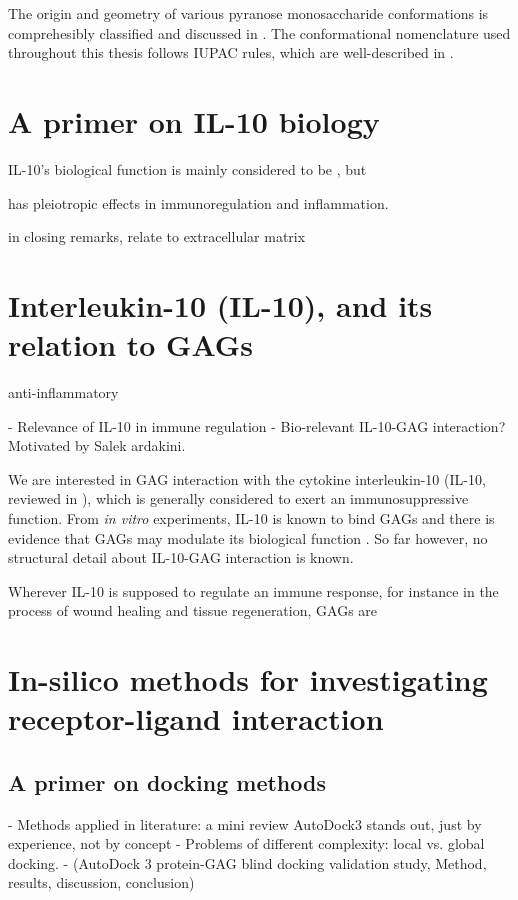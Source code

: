 The origin and geometry of various pyranose monosaccharide conformations is
comprehesibly classified and discussed in
\cite{classification_pyranose_conformers_1960}. The conformational nomenclature
used throughout this thesis follows IUPAC rules, which are well-described in
\cite{iupac_gag_conformations_1980}.


\section{A primer on IL-10 biology}

 IL-10's biological function is mainly considered to be
, but

 has pleiotropic effects in immunoregulation and
inflammation.


        in closing remarks, relate to extracellular matrix


\section{Interleukin-10 (IL-10), and its relation to GAGs}


 anti-inflammatory

- Relevance of IL-10 in immune regulation
- Bio-relevant IL-10-GAG interaction? Motivated by Salek ardakini.

We are interested in GAG interaction with the cytokine interleukin-10 (IL-10,
reviewed in \cite{moore_2001}), which is generally considered to exert an
immunosuppressive function. From \textit{in vitro} experiments, IL-10 is known
to bind GAGs and there is evidence that GAGs may modulate its biological
function \cite{salek_ardakani_2000}. So far however, no structural detail about
IL-10-GAG interaction is known.


Wherever IL-10 is supposed to
regulate an immune response, for instance in the process of wound healing and
tissue regeneration, GAGs are


\section{In-silico methods for investigating receptor-ligand interaction}

\subsection{A primer on docking methods}


    - Methods applied in literature: a mini review
        AutoDock3 stands out, just by experience, not by concept
    - Problems of different complexity: local vs. global docking.
    - (AutoDock 3 protein-GAG blind docking validation study,
        Method, results, discussion, conclusion)

